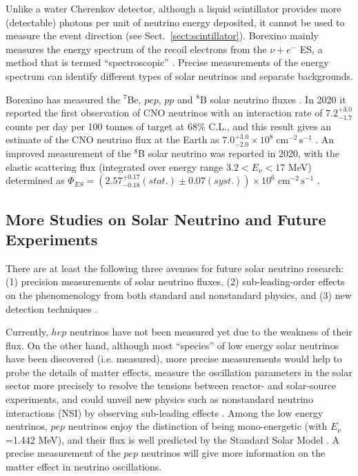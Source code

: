 Unlike a water Cherenkov detector, although a liquid scintillator provides more (detectable) photons per unit of neutrino energy deposited, it cannot be used to measure the event direction (see Sect.~\ref{sect:scintillator}). Borexino mainly measures the energy spectrum of the recoil electrons from the $\nu+e^-$ ES, a method that is termed ``spectroscopic'' \cite{agostini2020improved}. Precise measurements of the energy spectrum can identify different types of solar neutrinos and separate backgrounds.

Borexino has measured the $^7$Be, $pep$, $pp$ and $^8$B solar neutrino fluxes \cite{agostini2018comprehensive}. In 2020 it reported the first observation of CNO neutrinos with an interaction rate of $7.2^{+3.0}_{-1.7}$ counts per day per 100 tonnes of target at 68\% C.L., and this result gives an estimate of the CNO neutrino flux at the Earth as $7.0^{+3.0}_{-2.0}\times 10^8 \; \mathrm{cm^{-2} \, s^{-1}}$ \cite{borexino2020experimental}. An improved measurement of the $^8$B solar neutrino was reported in 2020, with the elastic scattering flux (integrated over energy range $3.2<E_\nu <17$ MeV) determined as $\Phi_{ES}=(2.57^{+0.17}_{-0.18}(stat.)\pm 0.07 (syst.))\times 10^6 \; \mathrm{cm^{-2} \, s^{-1}}$ \cite{agostini2020improved}.

\subsection{More Studies on Solar Neutrino and Future Experiments}\label{sect:futureSolar}

There are at least the following three avenues for future solar neutrino research: (1) precision measurements of solar neutrino fluxes, (2) sub-leading-order effects on the phenomenology from both standard and nonstandard physics, and (3) new detection techniques \cite{antonio2018state}.

Currently, $hep$ neutrinos have not been measured yet due to the weakness of their flux. On the other hand, although most ``species'' of low energy solar neutrinos have been discovered (i.e. measured), more precise measurements would help to probe the details of matter effects, measure the oscillation parameters in the solar sector more precisely to resolve the tensions between reactor- and solar-source experiments, and could unveil new physics such as nonstandard neutrino interactions (NSI) by observing sub-leading effects \cite{gann2015everything}. Among the low energy neutrinos, $pep$ neutrinos enjoy the distinction of being mono-energetic (with $E_\nu$=1.442 MeV), and their flux is well predicted by the Standard Solar Model \cite{davini2016cno}. A precise measurement of the $pep$ neutrinos will give more information on the matter effect in neutrino oscillations. 

